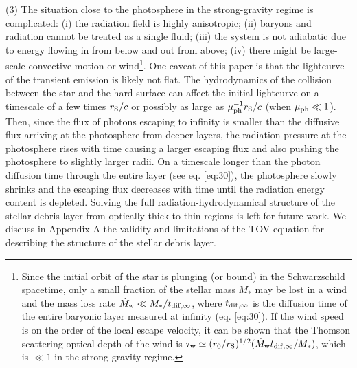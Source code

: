 \documentclass[useAMS,usenatbib]{mn2e}
\begin{document}
(3) The situation close to the photosphere in the strong-gravity
regime is complicated: (i) the radiation field is highly anisotropic;
(ii) baryons and radiation cannot be treated as a single fluid; (iii)
the system is not adiabatic due to energy flowing in from below and
out from above; (iv) there might be large-scale convective
motion or wind\footnote{
Since the initial orbit of the star is plunging (or bound)
in the Schwarzschild spacetime, only a small fraction of the stellar
mass $M_*$ may be lost in a wind and the mass loss rate $\dot{M}_{\rm 
  w}\ll M_*/t_{\rm dif, \infty}$, where $t_{\rm dif, \infty}$ is the
diffusion time of the entire baryonic layer measured at infinity
(eq. \ref{eq:30}). If the wind speed is on the order of the local
escape velocity, it can be shown that the Thomson scattering optical
depth of the wind is $\tau_{\rm w}\simeq (r_0/r_{\rm S})^{1/2}
(\dot{M}_{\rm w} t_{\rm dif, \infty}/M_*)$, which is $\ll1$ in the
strong gravity regime.}. One caveat of
this paper is that the lightcurve of the 
transient emission is likely not flat. The hydrodynamics of the
collision between the star and the hard surface can affect the
initial lightcurve on a timescale of a few times $r_{\rm S}/c$ or
possibly as large as $\mu_{\rm ph}^{-1}r_{\rm S}/c$ (when $\mu_{\rm
  ph}\ll 1$). Then, since the flux of photons escaping to infinity is
smaller than the diffusive flux arriving at the photosphere from
deeper layers, the radiation pressure at the photosphere rises with
time causing a larger escaping flux and also pushing the photosphere
to slightly larger radii. On a timescale longer than the photon
diffusion time through the entire layer (see eq. \ref{eq:30}), the
photosphere slowly shrinks and the escaping flux decreases with time
until the radiation energy content is depleted. Solving the full
radiation-hydrodynamical structure of the 
stellar debris layer from optically thick to thin regions is left for
future work. We discuss in Appendix A the validity and limitations of
the TOV equation for describing the structure of the stellar debris layer.

\end{document}
